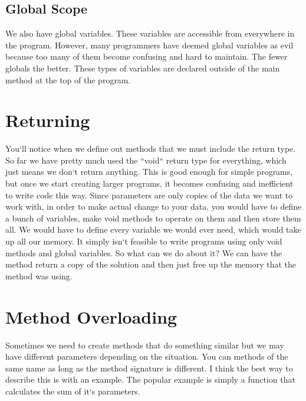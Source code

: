 \documentclass[11]{article}
\begin{document}
\subsection{Global Scope}
We also have global variables. These variables are accessible from everywhere in the program. However, many programmers have deemed global variables as evil because too many of them become confusing and hard to maintain. The fewer globals the better. These types of variables are declared outside of the main method at the top of the program.


\section{Returning}
You`ll notice when we define out methods that we must include the return type. So far we have pretty much used the ``void`` return type for everything, which just means we don`t return anything. This is good enough for simple programs, but once we start creating larger programs, it becomes confusing and inefficient to write code this way. Since parameters are only copies of the data we want to work with, in order to make actual change to your data, you would have to define a bunch of variables, make void methods to operate on them and then store them all. We would have to define every variable we would ever need, which would take up all our memory. It simply isn`t feasible to write programs using only void methods and global variables. So what can we do about it? We can have the method return a copy of the solution and then just free up the memory that the method was using.\\

\section{Method Overloading}
Sometimes we need to create methods that do something similar but we may have different parameters depending on the situation. You can methods of the same name as long as the method signature is different. I think the best way to describe this is with an example. The popular example is simply a function that calculates the sum of it`s parameters.
\end{document}

